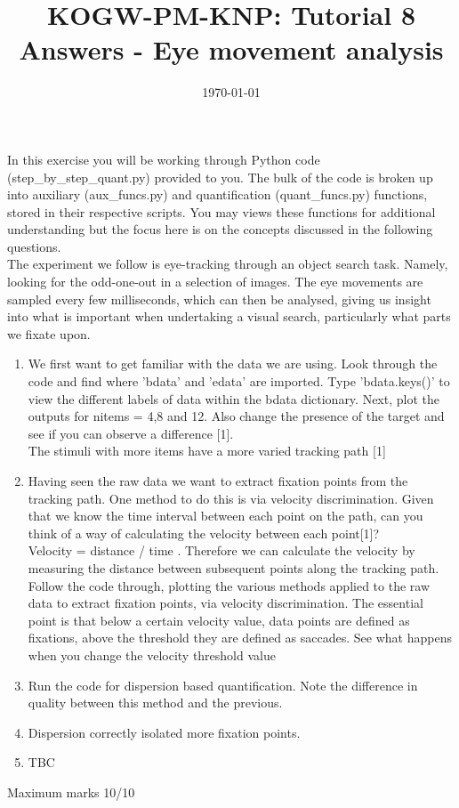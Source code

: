 \documentclass[12pt,english]{scrartcl}
\title{KOGW-PM-KNP: Tutorial 8 Answers - Eye movement analysis}
\author{}
\date{\today}
\begin{document}
	
	\maketitle
	In this exercise you will be working through Python code (step\_by\_step\_quant.py) provided to you. The bulk of the code is broken up into auxiliary (aux\_funcs.py) and quantification (quant\_funcs.py) functions, stored in their respective scripts. You may views these functions for additional understanding but the focus here is on the concepts discussed in the following questions. \\
	
	The experiment we follow is eye-tracking through an object search task. Namely, looking for the odd-one-out in a selection of images. The eye movements are sampled every few milliseconds, which can then be analysed, giving us insight into what is important when undertaking a visual search, particularly what parts we fixate upon.
	
	
	\begin{enumerate}
		\item We first want to get familiar with the data we are using. Look through the code and find where 'bdata' and 'edata' are imported. Type 'bdata.keys()' to view the different labels of data within the bdata dictionary. Next, plot the outputs for nitems = 4,8 and 12. Also change the presence of the target and see if you can observe a difference [1]. \\
		
		\color{blue}
		The stimuli with more items have a more varied tracking path [1] 
		
		\color{black}
		\item Having seen the raw data we want to extract fixation points from the tracking path. One method to do this is via velocity discrimination. Given that we know the time interval between each point on the path, can you think of a way of calculating the velocity between each point[1]? \\
		
		\color{blue}
		Velocity = distance / time . Therefore we can calculate the velocity by measuring the distance between subsequent points along the tracking path. \\
		
		\color{black}
		Follow the code through, plotting the various methods applied to the raw data to extract fixation points, via velocity discrimination. The essential point is that below a certain velocity value, data points are defined as fixations, above the threshold they are defined as saccades. See what happens when you change the velocity threshold value \\
		
		\item Run the code for dispersion based quantification. Note the difference in quality between this method and the previous. 
		\item[]
		\color{blue}
		Dispersion correctly isolated more fixation points.
		
		\color{black}
		\item TBC
		
		
	\end{enumerate}
	
	Maximum marks 10/10 \\
	
\end{document}
